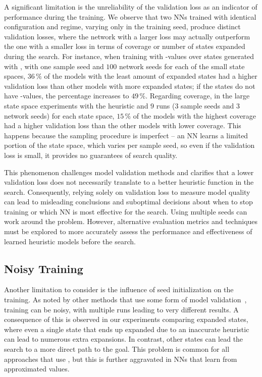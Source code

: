 A significant limitation is the unreliability of the validation loss as an indicator of performance during the training. We observe that two NNs trained with identical configuration and regime, varying only in the training seed, produce distinct validation losses, where the network with a larger loss may actually outperform the one with a smaller loss in terms of coverage or number of states expanded during the search. For instance, when training with \hstar-values over states generated with \bfsrw, with one sample seed and $100$ network seeds for each of the small state spaces, $36\,\%$ of the models with the least amount of expanded states had a higher validation loss than other models with more expanded states; if the states do not have \hstar-values, the percentage increases to $49\,\%$. Regarding coverage, in the large state space experiments with the heuristic \hnnrs and $9$ runs ($3$ sample seeds and $3$ network seeds) for each state space, $15\,\%$ of the models with the highest coverage had a higher validation loss than the other models with lower coverage. This happens because the sampling procedure is imperfect -- an NN learns a limited portion of the state space, which varies per sample seed, so even if the validation loss is small, it provides no guarantees of search quality.

This phenomenon challenges model validation methods and clarifies that a lower validation loss does not necessarily translate to a better heuristic function in the search. Consequently, relying solely on validation loss to measure model quality can lead to misleading conclusions and suboptimal decisions about when to stop training or which NN is most effective for the search. Using multiple seeds can work around the problem. However, alternative evaluation metrics and techniques must be explored to more accurately assess the performance and effectiveness of learned heuristic models before the search.

\subsection{Noisy Training}
\label{sec:noisy-training}

Another limitation to consider is the influence of seed initialization on the training. As noted by other methods that use some form of model validation~\cite{ferber2020neural, shen2020learning, ferber2022neural, otoole2022sampling}, training can be noisy, with multiple runs leading to very different results. A consequence of this is observed in our experiments comparing expanded states, where even a single state that ends up expanded due to an inaccurate heuristic can lead to numerous extra expansions. In contrast, other states can lead the search to a more direct path to the goal. This problem is common for all approaches that use \gbfs, but this is further aggravated in NNs that learn from approximated values.


